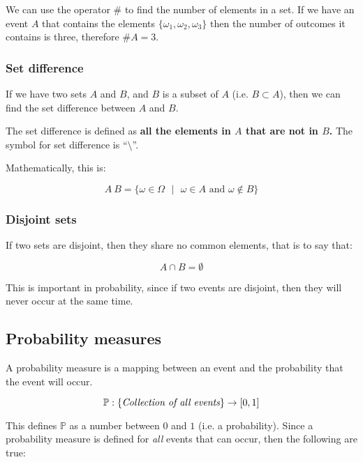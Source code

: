 We can use the operator $\#$ to find the number of elements in a set. If we have
an event $A$ that contains the elements $\{\omega_1, \omega_2, \omega_3\}$ then
the number of outcomes it contains is three, therefore $\#A = 3$.

\subsubsection{Set difference}

If we have two sets $A$ and $B$, and $B$ is a subset of $A$ (i.e. $B \subset
A$), then we can find the set difference between $A$ and $B$.

The set difference is defined as {\bf all the elements in $A$ that are not in
$B$.} The symbol for set difference is ``$\setminus$''.

Mathematically, this is:

\begin{dmath*}
	{A \ B = \{\omega \in \Omega \textrm{ } \vert \textrm{ } \omega \in A \textrm{ and } \omega \not\in B\}}
\end{dmath*}

\subsubsection{Disjoint sets}

If two sets are disjoint, then they share no common elements, that is to say
that:

\begin{dmath*}
	A \cap B = \emptyset
\end{dmath*}

This is important in probability, since if two events are disjoint, then they
will never occur at the same time.

\subsection{Probability measures}

A probability measure is a mapping between an event and the probability that the
event will occur.

\begin{dmath*}
	\mathbb{P} : \{\textrm{\it Collection of all events}\} \rightarrow [0,1]
\end{dmath*}

This defines $\mathbb{P}$ as a number between $0$ and $1$ (i.e. a probability).
Since a probability measure is defined for {\it all} events that can occur, then
the following are true:


